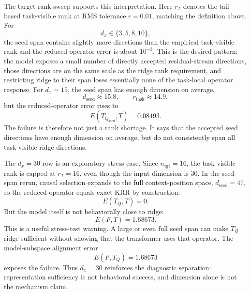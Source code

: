 \documentclass[11pt]{article}
\begin{document}
The target-rank sweep supports this interpretation. Here \(r_T\) denotes the tail-based
task-visible rank at RMS tolerance \(\epsilon=0.01\), matching the definition above. For
\[
d_x\in\{3,5,8,10\},
\]
the seed span contains slightly more directions than the empirical task-visible rank and the
reduced-operator error is about \(10^{-3}\). This is the desired pattern: the model exposes a small
number of directly accepted residual-stream directions, those directions are on the same scale as
the ridge rank requirement, and restricting ridge to their span loses essentially none of the
task-local operator response. For \(d_x=15\), the seed span has enough dimension on average,
\[
d_{\mathrm{seed}}\approx15.8,
\qquad
r_{\mathrm{task}}\approx14.9,
\]
but the reduced-operator error rises to
\[
E(T_{Q_{\mathrm{seed}}},T)=0.08493.
\]
The failure is therefore not just a rank shortage. It says that the accepted seed directions have
enough dimension on average, but do not consistently span all task-visible ridge directions.

\begin{table}[htbp]
\centering
\caption{Experiment 2 complete target-rank sweep with causal seed-span selection, mean over 16
episodes per setting.}
\scriptsize
\setlength{\tabcolsep}{2.5pt}
\renewcommand{\arraystretch}{0.85}
\renewcommand{\arraystretch}{1}
\end{table}

The \(d_x=30\) row is an exploratory stress case. Since \(n_{\mathrm{tgt}}=16\), the task-visible
rank is capped at \(r_T=16\), even though the input dimension is 30. In the seed-span rerun, causal
selection expands to the full context-position space, \(d_{\mathrm{seed}}=47\), so the reduced
operator equals exact KRR by construction:
\[
E(T_Q,T)=0.
\]
But the model itself is not behaviorally close to ridge:
\[
E(F,T)=1.68673.
\]
This is a useful stress-test warning. A large or even full seed span can make \(T_Q\) ridge-sufficient
without showing that the transformer uses that operator. The model-subspace alignment error
\[
E(F,T_Q)=1.68673
\]
exposes the failure.
Thus \(d_x=30\) reinforces the diagnostic separation: representation sufficiency is not behavioral
success, and dimension alone is not the mechanism claim.
\end{document}
